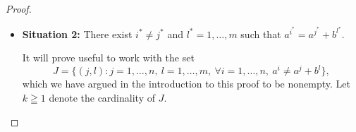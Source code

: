 \documentclass[pdflatex,sn-apa,11pt]{sn-jnl}%
\begin{document}
\begin{proof}
\begin{itemize}
Let $z^{i, l} = a^{i} + b^{l}$, $i = 1, ..., n$, $l = 1, \dots, m$ be any member of $A+B$. We have assumed here that $z^{i}$ is different than $a^{j}$ for each $j \neq i$. Furthermore, $z^{i} \neq a^{i}$ because $b^{l}I0_{G}$. This establishes that $z^{i} \notin \mathscr{E}(A+B) = \mathscr{E}(A)$, and hence, by Theorem \ref{thm4}, the existence of an index $j$ such that $a^{j}Pz^{i,l}$. Property (P3) tells us that since $b^lI0_{G}$, the comparison $a^{i}Rz^{i,l}$---and by extension $a^{i}Pz^{i,l}$--- does not hold, so that $j \neq i$. By repeating this argument for all $z^{i,l}$, $i = 1, ..., n$, $l = 1, \dots, m$ we construct a set of indices $i_{11}, ..., i_{1m}, \dots, i_{n1}, \dots, i_{nm}$ with $i_{jl} \neq j$ for all $j$ and $l$ such that 
\begin{equation*}
  \left\{
    \begin{aligned}
      & a^{i_{11}}P(a^{1} + b^{1}), \\
      & \dots \\
      & a^{i_{1m}}P(a^{1} + b^{m}), \\
      & a^{i_{21}}P(a^{2} + b^{1}), \\
      & \dots \\
      & a^{i_{2m}}P(a^{2} + b^{m}), \\
      & \dots \\
      & a^{i_{nm}}P(a^{n} + b^{m}), \\
      & b^{j}I{0_G}, \forall j = 1, ..., m,\\
    \end{aligned}
  \right.
\end{equation*}
an absurdity in view of Proposition \ref{prop4_gen}.
\item{\textbf{Situation 2:}} There exist $i^{*} \neq j^{*}$ and $l^* = 1, \dots, m$ such that $a^{i^{*}} = a^{j^{*}} + b^{l^*}$.

It will prove useful to work with the set \begin{equation*}J = \{(j, l): j = 1, \dots, n,\ l = 1, \dots, m,\ \forall i = 1, \dots, n,\ a^{i} \neq a^{j}+b^l\},\end{equation*} which we have argued in the introduction to this proof to be nonempty. Let $k \geqq 1$ denote the cardinality of $J$.


\end{itemize}
\end{proof}
\end{document}
